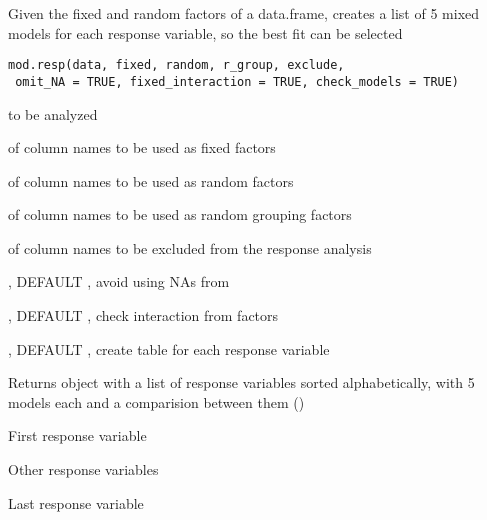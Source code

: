 \documentclass[letterpaper]{book}
\begin{document}
%
\begin{Description}\relax
Given the fixed and random factors of a data.frame, creates a list of 5 mixed models for each response variable,
so the best fit can be selected
\end{Description}
%
\begin{Usage}
\begin{verbatim}
mod.resp(data, fixed, random, r_group, exclude,
 omit_NA = TRUE, fixed_interaction = TRUE, check_models = TRUE)
\end{verbatim}
\end{Usage}
%
\begin{Arguments}
\begin{ldescription}
\item[\code{data}] 
 to be analyzed

\item[\code{fixed}] 
 of column names to be used as fixed factors

\item[\code{random}] 
 of column names to be used as random factors

\item[\code{r\_group}] 
 of column names to be used as random grouping factors

\item[\code{exclude}] 
 of column names to be excluded from the response analysis

\item[\code{omit\_NA}] 
, DEFAULT , avoid using NAs from 

\item[\code{fixed\_interaction}] 
, DEFAULT , check interaction from  factors

\item[\code{check\_models}] 
, DEFAULT , create  table for each response variable

\end{ldescription}
\end{Arguments}
%
\begin{Value}
Returns  object with a list of response variables sorted alphabetically,
with 5 models each and a comparision between them ()

\begin{ldescription}
\item[\code{resp\_1}] First response variable
\item[\code{resp\_...}] Other response variables
\item[\code{resp\_n}] Last response variable
\end{ldescription}

\end{Value}
\end{document}
